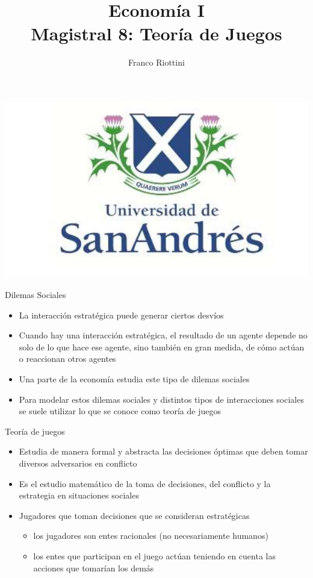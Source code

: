 \documentclass{beamer}
\title[Economía I]{Economía I \vspace{4mm}
\\ Magistral 8: Teoría de Juegos}
\date{}
\author[Riottini]{Franco Riottini}
\institute[]{Universidad de San Andrés}
\begin{document}
\begin{frame}
\titlepage
\centering
\includegraphics[scale=0.2]{../Figures/logoUDESA.jpg} 
\end{frame}


\begin{frame}{Dilemas Sociales}
    \begin{itemize}
        \item La interacción estratégica puede generar ciertos desvíos
        \item Cuando hay una interacción estratégica, el resultado de un agente depende no solo de lo que hace ese agente, sino también en gran medida, de cómo actúan o reaccionan otros agentes
        \item Una parte de la economía estudia este tipo de dilemas sociales
        \item Para modelar estos dilemas sociales y distintos tipos de interacciones sociales se suele utilizar lo que se conoce como teoría de juegos
    \end{itemize}
\end{frame}

\begin{frame}{Teoría de juegos}
    \begin{itemize}
        \item Estudia de manera formal y abstracta las decisiones óptimas que deben tomar diversos adversarios en conflicto
        \item Es el estudio matemático de la toma de decisiones, del conflicto y la estrategia en situaciones sociales
        \item Jugadores que toman decisiones que se consideran estratégicas
        \begin{itemize}
            \item los jugadores son entes racionales (no necesariamente humanos)
            \item los entes que participan en el juego actúan teniendo en cuenta las acciones que tomarían los demás
        \end{itemize}
    \end{itemize}
\end{frame}
\end{document}
